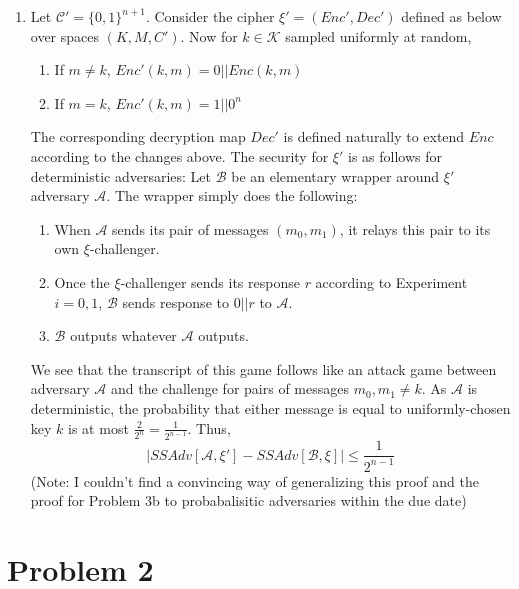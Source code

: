 \documentclass[11pt]{article}
\begin{document}
\begin{enumerate}
  \item Let $\mathcal{C}' = \{0,1\}^{n+1}$. Consider the cipher $\xi' = (Enc', Dec')$ defined as below over spaces $(K, M, C')$. Now for $k \in \mathcal{K}$ sampled uniformly at random,
  \begin{enumerate}
    \item If $m \neq k$, $Enc'(k, m) = 0 || Enc(k, m)$
    \item If $m = k$, $Enc'(k, m) = 1 || 0^n$
  \end{enumerate}
  The corresponding decryption map $Dec'$ is defined naturally to extend $Enc$ according to the changes above. The security for $\xi'$ is as follows for deterministic adversaries:
  Let $\mathcal{B}$ be an elementary wrapper around $\xi'$ adversary $\mathcal{A}$. The wrapper simply does the following:
  \begin{enumerate}
    \item When $\mathcal{A}$ sends its pair of messages $(m_0, m_1)$, it relays this pair to its own $\xi$-challenger.
    \item Once the $\xi$-challenger sends its response $r$ according to Experiment $i = 0,1$, $\mathcal{B}$ sends response to $0||r$ to $\mathcal{A}$.
    \item $\mathcal{B}$ outputs whatever $\mathcal{A}$ outputs.
  \end{enumerate}
  We see that the transcript of this game follows like an attack game between adversary $\mathcal{A}$ and the challenge for pairs of messages $m_0, m_1 \neq k$. As $\mathcal{A}$ is deterministic, the probability that either message is equal to uniformly-chosen key $k$ is at most $\frac{2}{2^n} = \frac{1}{2^{n-1}}$. Thus,
  $$ |SSAdv[\mathcal{A}, \xi'] - SSAdv[\mathcal{B}, \xi]| \leq \frac{1}{2^{n-1}}$$
  (Note: I couldn't find a convincing way of generalizing this proof and the proof for Problem 3b to probabalisitic adversaries within the due date)
\end{enumerate}

\section*{Problem 2}
\end{document}
